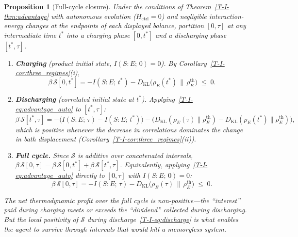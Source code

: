 \documentclass[12pt,a4paper,openany]{book}
\newtheorem{proposition}[theorem]{Proposition}
\begin{document}
\begin{proposition}[Full-cycle closure]
\label{T-I-prop:full_cycle}
Under the conditions of
Theorem~\textup{\ref{T-I-thm:advantage}} with autonomous evolution
($H_{\mathrm{ctrl}} = 0$) and negligible interaction-energy changes
at the endpoints of each displayed balance, partition $[0,\tau]$ at any
intermediate time $t^*$ into a charging phase $[0,t^*]$ and
a discharging phase $[t^*,\tau]$.
\begin{enumerate}
\item[\textup{(i)}]
  \textbf{Charging} (product initial state, $I(S{:}E;\,0) = 0$).
  By Corollary~\textup{\ref{T-I-cor:three_regimes}(i)},
  \begin{equation}
  \label{T-I-eq:charge}
  \beta\,\mathcal{S}[0,t^*]
  = -I(S{:}E;\,t^*)
    - D_{\mathrm{KL}}\!\bigl(\rho_E(t^*) \,\big\|\,
      \rho_E^{\mathrm{th}}\bigr)
  \;\leq\; 0.
  \end{equation}
\item[\textup{(ii)}]
  \textbf{Discharging} (correlated initial state at $t^*$).
  Applying~\eqref{T-I-eq:advantage_auto} to $[t^*,\tau]$:
  \begin{equation}
  \label{T-I-eq:discharge}
  \beta\,\mathcal{S}[t^*,\tau]
  = -\bigl(I(S{:}E;\,\tau) - I(S{:}E;\,t^*)\bigr)
    - \bigl(D_{\mathrm{KL}}(\rho_E(\tau)\|\rho_E^{\mathrm{th}})
      - D_{\mathrm{KL}}(\rho_E(t^*)\|\rho_E^{\mathrm{th}})\bigr),
  \end{equation}
  which is positive whenever the decrease in correlations
  dominates the change in bath displacement
  (Corollary~\textup{\ref{T-I-cor:three_regimes}(ii)}).
\item[\textup{(iii)}]
  \textbf{Full cycle.}
  Since $\mathcal{S}$ is additive over concatenated intervals,
  $\beta\,\mathcal{S}[0,\tau]
  = \beta\,\mathcal{S}[0,t^*]
    + \beta\,\mathcal{S}[t^*,\tau]$.
  Equivalently, applying~\eqref{T-I-eq:advantage_auto} directly to
  $[0,\tau]$ with $I(S{:}E;\,0) = 0$:
  \begin{equation}
  \label{T-I-eq:full_cycle}
  \beta\,\mathcal{S}[0,\tau]
  = -I(S{:}E;\,\tau)
    - D_{\mathrm{KL}}\!\bigl(\rho_E(\tau) \,\big\|\,
      \rho_E^{\mathrm{th}}\bigr)
  \;\leq\; 0.
  \end{equation}
\end{enumerate}
The net thermodynamic profit over the full cycle is
non-positive---the ``interest'' paid during charging
meets or exceeds the ``dividend'' collected during
discharging.
But the \emph{local} positivity of $\mathcal{S}$ during
discharge~\eqref{T-I-eq:discharge} is what enables the agent
to survive through intervals that would kill a memoryless
system.
\end{proposition}
\end{document}
